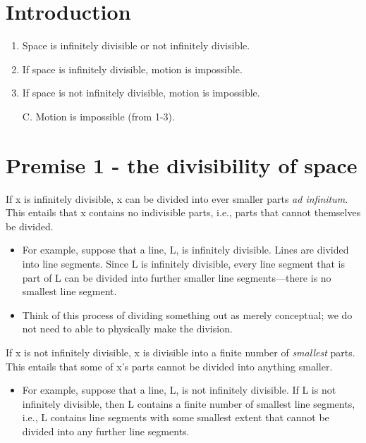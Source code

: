 \documentclass[oneside]{article}
\begin{document}
\thispagestyle{fancy}

\section*{Introduction}

\begin{enumerate}
\def\labelenumi{\arabic{enumi}.}
\item
  Space is infinitely divisible or not infinitely divisible.
\item
  If space is infinitely divisible, motion is impossible.
\item
  If space is not infinitely divisible, motion is impossible.
\item[C.]
  Motion is impossible (from 1-3).
\end{enumerate}

\section*{Premise 1 - the divisibility of
space}\label{premise-1---the-divisibility-of-space}


If x is infinitely divisible, x can be divided into ever smaller parts
  \emph{ad infinitum}. This entails that x contains no indivisible parts,
  i.e., parts that cannot themselves be divided.

  \begin{itemize}
  \item
    For example, suppose that a line, L, is infinitely divisible. Lines
    are divided into line segments. Since L is infinitely divisible, every line segment that is part of L can be
    divided into further smaller line segments---there is no smallest
    line segment.
  \item
    Think of this process of dividing something out as merely
    conceptual; we do not need to able to physically make the division.
  \end{itemize}
  If x is not infinitely divisible, x is divisible into a finite
  number of \emph{smallest} parts. This entails that some of x's parts cannot be divided into anything smaller. 

  \begin{itemize}
  \itemsep1pt\parskip0pt
  \item
    For example, suppose that a line, L, is not infinitely divisible.
    If L is not infinitely divisible, then L contains a finite number of smallest line segments, i.e., L contains
    line segments with some smallest extent that cannot be divided into
    any further line segments.
  \end{itemize}
\end{document}
